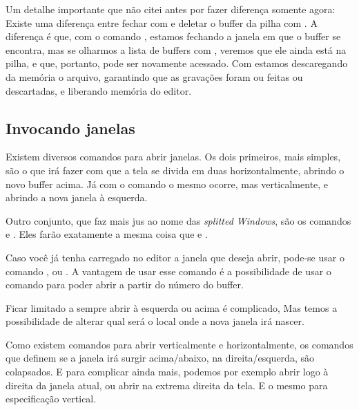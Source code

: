 Um detalhe importante que não citei antes por fazer diferença somente agora:
Existe uma diferença entre fechar com  e deletar o buffer da pilha com .
A diferença é que, com o comando , estamos fechando a janela em que o buffer se encontra,
mas se olharmos a lista de buffers com , veremos que ele ainda está na pilha, e que,
portanto, pode ser novamente acessado.
Com  estamos descaregando da memória o arquivo, garantindo que as gravações foram ou feitas ou descartadas,
e liberando memória do editor.

\subsection{Invocando janelas}
Existem diversos comandos para abrir janelas.
Os dois primeiros, mais simples, são o  que irá fazer com que a tela
se divida em duas horizontalmente, abrindo o novo buffer acima.
Já com o comando  o mesmo ocorre, mas verticalmente, e abrindo a nova janela à esquerda.


Outro conjunto, que faz mais jus ao nome das \textit{splitted Windows}, são os comandos  e 
.
Eles farão exatamente a mesma coisa que  e .


Caso você já tenha carregado no editor a janela que deseja abrir, pode-se usar o comando
, ou .
A vantagem de usar esse comando é a possibilidade de usar o comando 
para poder abrir a partir do número do buffer.


Ficar limitado a sempre abrir à esquerda ou acima é complicado,
Mas temos a possibilidade de alterar qual será o local onde a nova janela irá nascer.

Como existem comandos para abrir verticalmente e horizontalmente, os comandos que definem
se a janela irá surgir acima/abaixo, na direita/esquerda, são colapsados.
E para complicar ainda mais, podemos por exemplo abrir logo à direita da janela atual, ou
abrir na extrema direita da tela.
E o mesmo para especificação vertical.

